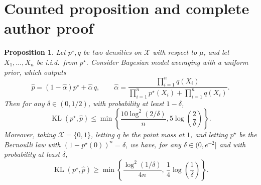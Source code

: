 \documentclass[10pt,a4paper]{amsart}
\renewcommand{\le}{\leqslant}
\renewcommand{\ge}{\geqslant}
\newcommand{\X}{\mathcal{X}}
\newcommand{\kl}{\operatorname{KL}}
\newtheorem{proposition}{Proposition}
\begin{document}
\section{Counted proposition and complete author proof}
\begin{proposition}
\label{prop:bayes-two}
Let $p^\star,q$ be two densities on $\X$ with respect to $\mu$, and let $X_1,\ldots,X_n$ be i.i.d.\ from $p^\star$. Consider Bayesian model averaging with a uniform prior, which outputs
\[
\widehat p=(1-\widehat\alpha)p^\star+\widehat\alpha\,q,\qquad
\widehat\alpha=\frac{\prod_{i=1}^n q(X_i)}{\prod_{i=1}^n p^\star(X_i)+\prod_{i=1}^n q(X_i)}.
\]
Then for any $\delta\in(0,1/2)$, with probability at least $1-\delta$,
\[
\kl(p^\star,\widehat p)\le \min\left\{\frac{10\log^2(2/\delta)}{n}, 5\log\left(\frac{2}{\delta}\right)\right\}.
\]
Moreover, taking $\X=\{0,1\}$, letting $q$ be the point mass at $1$, and letting $p^\star$ be the Bernoulli law with $(1-p^\star(0))^n=\delta$, we have, for any $\delta\in(0,e^{-2}]$ and with probability at least $\delta$,
\[
\kl(p^\star,\widehat p)\ge \min\left\{\frac{\log^2(1/\delta)}{4n},\, \frac{1}{4}\log\left(\frac{1}{\delta}\right)\right\}.
\]
\end{proposition}
\end{document}

